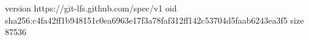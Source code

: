 version https://git-lfs.github.com/spec/v1
oid sha256:c4fa42ff1b948151c0ea6963e17f3a78faf312ff142c53704d5faab6243ea3f5
size 87536
